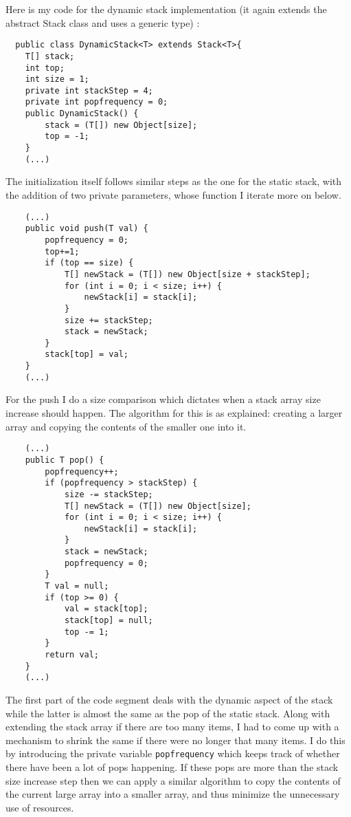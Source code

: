 \documentclass[a4paper,11pt]{article}
\begin{document}
Here is my code for the dynamic stack implementation (it again extends the abstract Stack class and uses a generic type) :
\begin{verbatim}
  public class DynamicStack<T> extends Stack<T>{
    T[] stack;
    int top;
    int size = 1;
    private int stackStep = 4;
    private int popfrequency = 0;
    public DynamicStack() {
        stack = (T[]) new Object[size];
        top = -1;
    }
    (...)
\end{verbatim}   
    The initialization itself follows similar steps as the one for the static stack, with the addition of two private parameters, whose function I iterate more on below.
\begin{verbatim}
    (...)
    public void push(T val) {
        popfrequency = 0;
        top+=1;
        if (top == size) {
            T[] newStack = (T[]) new Object[size + stackStep];
            for (int i = 0; i < size; i++) {
                newStack[i] = stack[i];
            }
            size += stackStep;
            stack = newStack;
        }
        stack[top] = val;
    }
    (...)
\end{verbatim}   

For the push I do a size comparison which dictates when a stack array size increase should happen. The algorithm for this is as explained: creating a larger array and copying the contents of the smaller one into it.
\begin{verbatim}
    (...)
    public T pop() {
        popfrequency++;
        if (popfrequency > stackStep) {
            size -= stackStep;
            T[] newStack = (T[]) new Object[size];
            for (int i = 0; i < size; i++) {
                newStack[i] = stack[i];
            }
            stack = newStack;
            popfrequency = 0;   
        }
        T val = null;
        if (top >= 0) {
            val = stack[top];
            stack[top] = null;
            top -= 1;
        }
        return val;
    }
    (...)

\end{verbatim}

The first part of the code segment deals with the dynamic aspect of the stack while the latter is almost the same as the pop of the static stack. Along with extending the stack array if there are too many items, I had to come up with a mechanism to shrink the same if there were no longer that many items. I do this by introducing the private variable {\tt popfrequency} which keeps track of whether there have been a lot of pops happening. If these pops are more than the stack size increase step then we can apply a similar algorithm to copy the contents of the current large array into a smaller array, and thus minimize the unnecessary use of resources.
\end{document}
